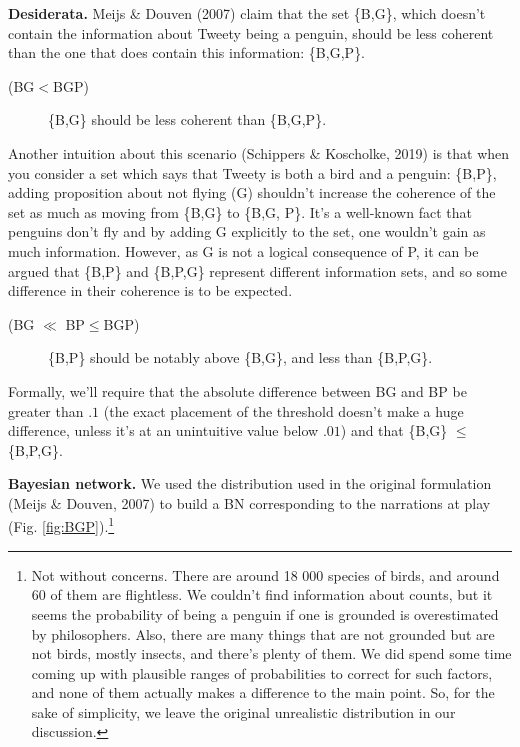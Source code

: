 \documentclass[
  10pt,
]{scrartcl}
\newcommand{\s}[1]{\textsf{#1}}
\begin{document}
\noindent \textbf{Desiderata.}
Meijs \& Douven (2007) claim that the set \{\s{B},\s{G}\}, which doesn't contain the information about Tweety being a penguin, should be less coherent than the one that does contain this information: \{\s{B},\s{G},\s{P}\}.

\vspace{2mm}\begin{description}
    \item[(\s{BG}$<$\s{BGP})] \{\s{B},\s{G}\}  should be less coherent than \{\s{B},\s{G},\s{P}\}. 
\end{description}\vspace{2mm}

Another intuition about this scenario (Schippers \& Koscholke, 2019) is that when you consider a set which says that Tweety is both a bird and a penguin: \{\s{B},\s{P}\}, adding proposition about not flying (\s{G}) shouldn't increase the coherence of the set as much as moving from \{\s{B},\s{G}\} to \{\s{B},\s{G}, \s{P}\}. It's a well-known fact that penguins don't fly and by adding \s{G} explicitly to the set, one wouldn't gain as much information.
However, as \s{G} is not a logical consequence of \s{P}, it can be argued that \{\s{B},\s{P}\} and \{\s{B},\s{P},\s{G}\} represent different information sets, and so some difference in their coherence is to be expected.

\vspace{2mm}\begin{description}
    \item[(\s{BG} $\ll$ \s{BP}$\leq$\s{BGP})]  \{\s{B},\s{P}\} should be notably above  \{\s{B},\s{G}\}, and less than \{\s{B},\s{P},\s{G}\}.
\end{description}\vspace{2mm}

\noindent Formally, we'll require that the absolute difference between \s{BG} and \s{BP} be greater than \(.1\) (the exact placement of the threshold doesn't make a huge difference, unless it's at an unintuitive value below \(.01\)) and that \{\s{B},\s{G}\} \(\leq\) \{\s{B},\s{P},\s{G}\}.

\noindent \textbf{Bayesian network.} We used the distribution used in the original formulation (Meijs \& Douven, 2007) to build a BN corresponding to the narrations at play (Fig. \ref{fig:BGP}).\footnote{Not without concerns. There are around 18 000 species of birds, and around 60 of them are flightless. We  couldn't find information about counts, but it seems the probability of being a penguin if one is grounded is overestimated by philosophers.  Also, there are many things that are not grounded but are not birds, mostly insects, and there's plenty of them. We did spend some time coming up with plausible ranges of probabilities to correct for such factors, and none of them actually makes a difference to the main point. So, for the sake of simplicity, we leave the original unrealistic distribution in our discussion.}
\end{document}
